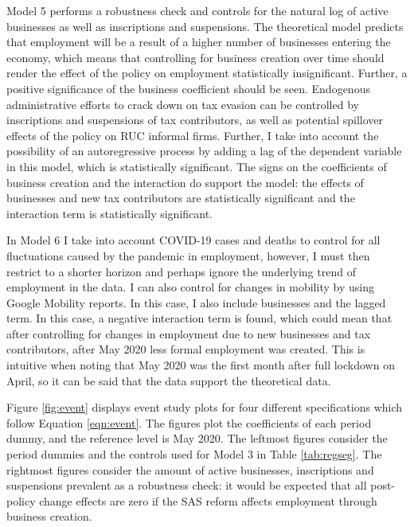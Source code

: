 \documentclass[11pt,a4paper]{article}\usepackage[]{graphicx}\usepackage[]{xcolor}
\begin{document}
Model 5 performs a robustness check and controls for the natural log of active businesses as well as inscriptions and suspensions. The theoretical model predicts that employment will be a result of a higher number of businesses entering the economy, which means that controlling for business creation over time should render the effect of the policy on employment statistically insignificant. Further, a positive significance of the business coefficient should be seen. Endogenous administrative efforts to crack down on tax evasion can be controlled by inscriptions and suspensions of tax contributors, as well as potential spillover effects of the policy on RUC informal firms. Further, I take into account the possibility of an autoregressive process by adding a lag of the dependent variable in this model, which is statistically significant. The signs on the coefficients of business creation and the interaction do support the model: the effects of businesses and new tax contributors are statistically significant and the interaction term is statistically significant. 

In Model 6 I take into account COVID-19 cases and deaths to control for all fluctuations caused by the pandemic in employment, however, I must then restrict to a shorter horizon and perhaps ignore the underlying trend of employment in the data. I can also control for changes in mobility by using Google Mobility reports. In this case, I also include businesses and the lagged term. In this case, a negative interaction term is found, which could mean that after controlling for changes in employment due to new businesses and tax contributors, after May 2020 less formal employment was created. This is intuitive when noting that May 2020 was the first month after full lockdown on April, so it can be said that the data support the theoretical data. 

Figure \ref{fig:event} displays event study plots for four different specifications which follow Equation \ref{eqn:event}. The figures plot the coefficients of each period dummy, and the reference level is May 2020. The leftmost figures consider the period dummies and the controls used for Model 3 in Table \ref{tab:regseg}. The rightmost figures consider the amount of active businesses, inscriptions and suspensions prevalent as a robustness check: it would be expected that all post-policy change effects are zero if the SAS reform affects employment through business creation. 
\end{document}
